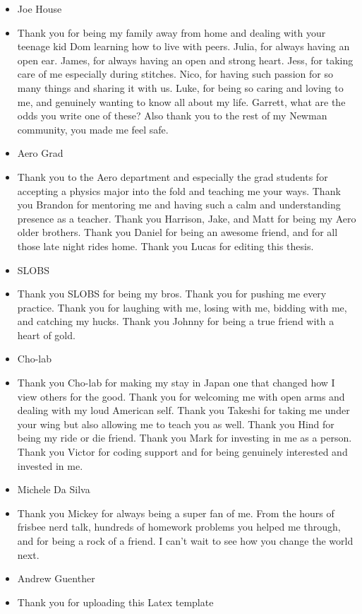 \begin{itemize}
    \item Joe House   
    \item[] Thank you for being my family away from home and dealing with your teenage kid Dom learning how to live with peers. Julia, for always having an open ear. James, for always having an open and strong heart. Jess, for taking care of me especially during stitches. Nico, for having such passion for so many things and sharing it with us. Luke, for being so caring and loving to me, and genuinely wanting to know all about my life. Garrett, what are the odds you write one of these? Also thank you to the rest of my Newman community, you made me feel safe.
    \item Aero Grad   
    \item[] Thank you to the Aero department and especially the grad students for accepting a physics major into the fold and teaching me your ways. Thank you Brandon for mentoring me and having such a calm and understanding presence as a teacher. Thank you Harrison, Jake, and Matt for being my Aero older brothers. Thank you Daniel for being an awesome friend, and for all those late night rides home. Thank you Lucas for editing this thesis.
    \item SLOBS  
    \item[] Thank you SLOBS for being my bros. Thank you for pushing me every practice. Thank you for laughing with me, losing with me, bidding with me, and catching my hucks. Thank you Johnny for being a true friend with a heart of gold.
    \item Cho-lab  
    \item[] Thank you Cho-lab for making my stay in Japan one that changed how I view others for the good. Thank you for welcoming me with open arms and dealing with my loud American self. Thank you Takeshi for taking me under your wing but also allowing me to teach you as well. Thank you Hind for being my ride or die friend. Thank you Mark for investing in me as a person. Thank you Victor for coding support and for being genuinely interested and invested in me.
    \item Michele Da Silva  
    \item[] Thank you Mickey for always being a super fan of me. From the hours of frisbee nerd talk, hundreds of homework problems you helped me through, and for being a rock of a friend. I can't wait to see how you change the world next. 
    \item Andrew Guenther   
    \item[] Thank you for uploading this Latex template
\end{itemize}
